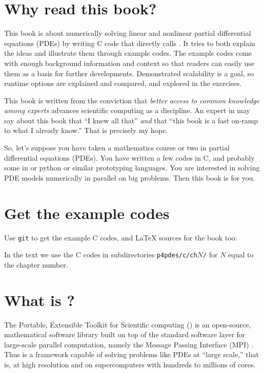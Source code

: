 
\section{Why read this book?}

This book is about numerically solving linear and nonlinear partial differential equations (PDEs) by writing C\cite{KernighanRitchie1988} code that directly calls \PETSc.  It tries to both explain the ideas and illustrate them through example codes.  The example codes come with enough background information and context so that readers can easily use them as a basis for further developments.  Demonstrated scalability is a goal, so runtime options are explained and compared, and explored in the exercises.

This book is written from the conviction that \emph{better access to common knowledge among experts} advances scientific computing as a discipline.  An expert in \PETSc may say about this book that ``I knew all that'' \emph{and} that ``this book is a fast on-ramp to what I already know.''  That is precisely my hope.

So, let's suppose you have taken a mathematics course or two in partial differential equations (PDEs).  You have written a few codes in C, and probably some in \Matlab or python or similar prototyping languages.  You are interested in solving PDE models numerically in parallel on big problems.  Then this book is for you.

\section{Get the example codes}

Use \texttt{git} to get the example C codes, and \LaTeX\xspace sources for the book too:
In the text we use the C codes in subdirectories \texttt{p4pdes/c/ch}$N$\texttt{/} for $N$ equal to the chapter number.

\section{What is \PETSc?}

The Portable, Extensible Toolkit for Scientific computing (\PETSc) is an open-source, mathematical software library built on top of the standard software layer for large-scale parallel computation, namely the Message Passing Interface (MPI) \citep{Groppetal1999}.  Thus \PETSc is a framework capable of solving problems like PDEs at ``large scale,'' that is, at high resolution and on supercomputers with hundreds to millions of cores.

